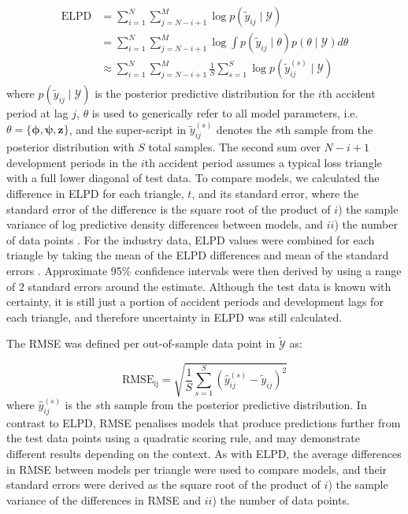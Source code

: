 \begin{align}
	\label{eq:elpd}
	\begin{split}
	\mathrm{ELPD} &= \sum_{i=1}^{N} \sum_{j=N - i + 1}^{M} 
					\log p(\tilde{y}_{ij} \mid \mathcal{Y})\\
				 &=	\sum_{i=1}^{N} \sum_{j=N - i + 1}^{M} 
					\log \int p(\tilde{y}_{ij} \mid \theta)
					p(\theta \mid \mathcal{Y})
					d \theta \\
				 &\approx \sum_{i=1}^{N} \sum_{j=N - i + 1}^{M} 
					\frac{1}{S} \sum_{s=1}^{S} 
					\log p(\tilde{y}_{ij}^{(s)} \mid \mathcal{Y})
	\end{split}
\end{align}
%
where $p(\tilde{y}_{ij} \mid \mathcal{Y})$
is the posterior predictive distribution for
the $i$th accident period at lag $j$,
$\theta$ is used to generically refer to all
model parameters, i.e. $\theta = \{\bm{\phi}, \bm{\psi}, \bm{z}\}$,
and the super-script in $\tilde{y}_{ij}^{(s)}$ denotes the
$s$th sample from the posterior distribution with $S$
total samples.
The second sum over $N - i + 1$ development periods in the
$i$th accident period assumes a typical loss triangle
with a full lower diagonal of test data.
To compare models, we
calculated the difference in ELPD for each triangle, $t$,
and its standard error,
where the standard error of the difference is the
square root of the product of $i$) the sample variance of log predictive
density differences between models, and $ii$) 
the number of data points \citep{vehtari2017,sivula2020}.
For the industry data, ELPD values were combined for each
triangle by taking the mean of the ELPD differences and 
mean of the standard errors \citep{sivula2020}. 
Approximate 95\% confidence intervals were then derived
by using a range of 2 standard errors around the estimate.
Although the test data is known with certainty,
it is still just a portion of accident periods
and development lags
for each triangle, and therefore uncertainty
in ELPD was still calculated.

The RMSE was defined per out-of-sample data point in
$\tilde{\mathcal{Y}}$ as:

\begin{equation}
	\label{eq:rmse}
	\mathrm{RMSE_{ij}} = \sqrt{\frac{1}{S} \sum_{s=1}^{S} (\hat{y}_{ij}^{(s)} - \tilde{y}_{ij})^2}
\end{equation}
%
where $\hat{y}_{ij}^{(s)}$ is the $s$th sample from the 
posterior predictive distribution.
In contrast to ELPD, RMSE penalises models that produce
predictions further from the test data points using a
quadratic scoring rule,
and may demonstrate different results depending
on the context.
As with ELPD, the average differences in RMSE
between models per triangle were used to compare models, and 
their standard errors were derived as the square root
of the product of $i$) the sample variance of the differences
in RMSE and $ii$) the number of data points.

